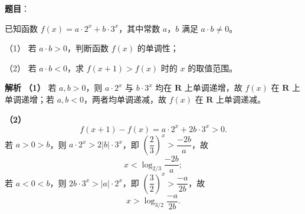 \begin{answer}

\textbf{题目}：

已知函数 $f(x)=a\cdot2^x+b\cdot3^x$，其中常数 $a$，$b$ 满足 $a\cdot b\neq0$。

（1） 若 $a\cdot b>0$，判断函数 $f(x)$ 的单调性；

（2） 若 $a\cdot b<0$，求 $f(x+1)>f(x)$ 时的 $x$ 的取值范围。

\textbf{解析}
\textbf{（1）} 若 $a,b>0$，则 $a\cdot2^x$ 与 $b\cdot3^x$ 均在 $\mathbf R$ 上单调递增，故 $f(x)$ 在 $\mathbf R$ 上单调递增；若 $a,b<0$，两者均单调递减，故 $f(x)$ 在 $\mathbf R$ 上单调递减。

\textbf{（2）}
\nopagebreak[4]
\[f(x+1)-f(x)=a\cdot2^x+2b\cdot3^x>0.\]
若 $a>0>b$，则 $a\cdot2^x>2|b|\cdot3^x$，即 $\left(\dfrac23\right)^x>\dfrac{-2b}{a}$，故
\nopagebreak[4]
\[x<\log_{2/3}\frac{-2b}{a};\]
若 $a<0<b$，则 $2b\cdot3^x>|a|\cdot2^x$，即 $\left(\dfrac32\right)^x>\dfrac{-a}{2b}$，故
\nopagebreak[4]
\[x>\log_{3/2}\frac{-a}{2b}.\]



\end{answer}
